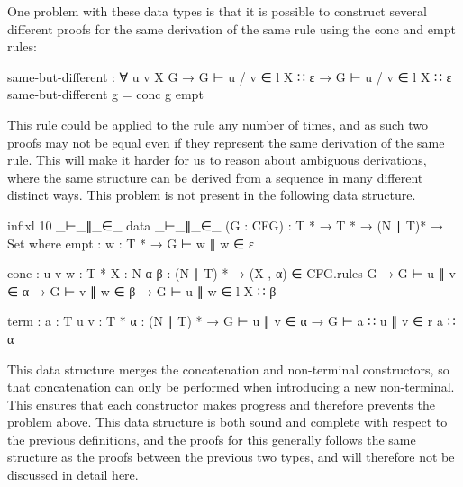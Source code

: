 	One problem with these data types is that it is possible to construct
	several different proofs for the same derivation of the same rule using the
	conc and empt rules:

	\begin{code}
		same-but-different : ∀ {u v X G} →
		  G ⊢ u / v ∈ l X ∷ ε →
		  G ⊢ u / v ∈ l X ∷ ε
		same-but-different g = conc g empt
	\end{code}

	This rule could be applied to the rule any number of times, and as such two
	proofs may not be equal even if they represent the same derivation of the
	same rule. This will make it harder for us to reason about ambiguous
	derivations, where the same structure can be derived from a sequence in
	many different distinct ways. This problem is not present in the following
	data structure.

	\begin{code}
		infixl 10 _⊢_∥_∈_
		data _⊢_∥_∈_ (G : CFG) : T * → T * → (N ∣ T)* → Set where
		  empt : {w : T *} →
		G ⊢ w ∥ w ∈ ε

		  conc : {u v w : T *} {X : N} {α β : (N ∣ T) *} →
		(X , α) ∈ CFG.rules G →
		G ⊢ u ∥ v ∈ α →
		G ⊢ v ∥ w ∈ β →
		  G ⊢ u ∥ w ∈ l X ∷ β

		  term : {a : T} {u v : T *} {α : (N ∣ T) *} →
		G ⊢ u ∥ v ∈ α →
		  G ⊢ a ∷ u ∥ v ∈ r a ∷ α
	\end{code}
	

	This data structure merges the concatenation and non-terminal constructors,
	so that concatenation can only be performed when introducing a new
	non-terminal. This ensures that each constructor makes progress and
	therefore prevents the problem above. This data structure is both sound and
	complete with respect to the previous definitions, and the proofs for this
	generally follows the same structure as the proofs between the previous two
	types, and will therefore not be discussed in detail here.
